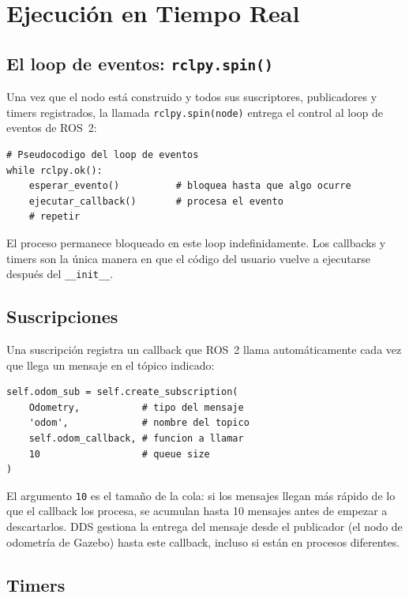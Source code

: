 \section{Ejecución en Tiempo Real}
\label{sec:runtime}

\subsection{El loop de eventos: \texttt{rclpy.spin()}}

Una vez que el nodo está construido y todos sus suscriptores, publicadores y timers registrados, la llamada \texttt{rclpy.spin(node)} entrega el control al loop de eventos de ROS~2:

\begin{lstlisting}[style=bash, caption={Comportamiento conceptual de \texttt{rclpy.spin()}.}]
# Pseudocodigo del loop de eventos
while rclpy.ok():
    esperar_evento()          # bloquea hasta que algo ocurre
    ejecutar_callback()       # procesa el evento
    # repetir
\end{lstlisting}

El proceso permanece bloqueado en este loop indefinidamente. Los callbacks y timers son la única manera en que el código del usuario vuelve a ejecutarse después del \texttt{\_\_init\_\_}.

\subsection{Suscripciones}

Una suscripción registra un callback que ROS~2 llama automáticamente cada vez que llega un mensaje en el tópico indicado:

\begin{lstlisting}[style=python, caption={Registro de una suscripción a odometría.}]
self.odom_sub = self.create_subscription(
    Odometry,           # tipo del mensaje
    'odom',             # nombre del topico
    self.odom_callback, # funcion a llamar
    10                  # queue size
)
\end{lstlisting}

El argumento \texttt{10} es el tamaño de la cola: si los mensajes llegan más rápido de lo que el callback los procesa, se acumulan hasta 10 mensajes antes de empezar a descartarlos. DDS gestiona la entrega del mensaje desde el publicador (el nodo de odometría de Gazebo) hasta este callback, incluso si están en procesos diferentes.

\subsection{Timers}

